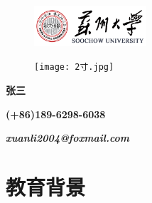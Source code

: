 \documentclass[UTF8,AutoFakeBold]{resume}
\begin{document}

\begin{figure}[h]
        \flushleft
        \includegraphics[height=1.5cm]{logo.jpg}
    \end{figure}
\vspace{-0.15\linewidth}
\begin{figure}[h]
        \flushright
        \texttt{[image: 2寸.jpg]}
    \end{figure}
\vspace{-0.185\linewidth}

\begin{minipage}[t]{\textwidth}
    \centering
    \LARGE\kaishu\textbf{{张\quad 三}}
\end{minipage}

\begin{center}
    \hspace{0.25em}{\small{\textbullet}}\hspace{0.25em}
\faPhone \textbf{\hspace{0.2em}(+86)189-6298-6038}

\hspace{0.25em}{\small{\textbullet}}\hspace{0.25em}
\faEnvelope \hspace{0.25em}\textbf{\textit{xuanli2004@foxmail.com}}
\end{center}

\section{\makebox[0.75em][c]{\faGraduationCap}\hspace{0.25em} \fangsong\textbf{教育背景}}
\end{document}
